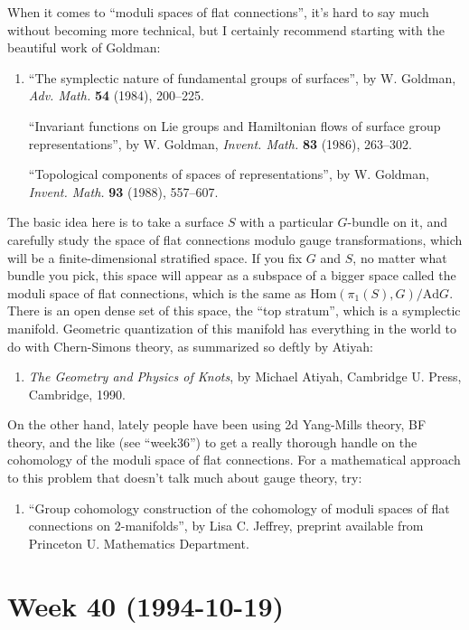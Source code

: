 \documentclass{article}
\def\tightlist{}
\begin{document}
When it comes to ``moduli spaces of flat connections'', it's hard to say
much without becoming more technical, but I certainly recommend starting
with the beautiful work of Goldman:

\begin{enumerate}
\def\labelenumi{\arabic{enumi})}
\setcounter{enumi}{3}
\item
  ``The symplectic nature of fundamental groups of surfaces'', by W.
  Goldman, \emph{Adv. Math.} \textbf{54} (1984), 200--225.

  ``Invariant functions on Lie groups and Hamiltonian flows of surface
  group representations'', by W. Goldman, \emph{Invent. Math.}
  \textbf{83} (1986), 263--302.

  ``Topological components of spaces of representations'', by W.
  Goldman, \emph{Invent. Math.} \textbf{93} (1988), 557--607.
\end{enumerate}

The basic idea here is to take a surface \(S\) with a particular
\(G\)-bundle on it, and carefully study the space of flat connections
modulo gauge transformations, which will be a finite-dimensional
stratified space. If you fix \(G\) and \(S\), no matter what bundle you
pick, this space will appear as a subspace of a bigger space called the
moduli space of flat connections, which is the same as
\(\mathrm{Hom}(\pi_1(S),G)/\mathrm{Ad} G\). There is an open dense set
of this space, the ``top stratum'', which is a symplectic manifold.
Geometric quantization of this manifold has everything in the world to
do with Chern-Simons theory, as summarized so deftly by Atiyah:

\begin{enumerate}
\def\labelenumi{\arabic{enumi})}
\setcounter{enumi}{4}
\tightlist
\item
  \emph{The Geometry and Physics of Knots}, by Michael Atiyah, Cambridge
  U. Press, Cambridge, 1990.
\end{enumerate}

On the other hand, lately people have been using 2d Yang-Mills theory,
BF theory, and the like (see ``week36'') to get a really thorough handle
on the cohomology of the moduli space of flat connections. For a
mathematical approach to this problem that doesn't talk much about gauge
theory, try:

\begin{enumerate}
\def\labelenumi{\arabic{enumi})}
\setcounter{enumi}{5}
\tightlist
\item
  ``Group cohomology construction of the cohomology of moduli spaces of
  flat connections on 2-manifolds'', by Lisa C. Jeffrey, preprint
  available from Princeton U. Mathematics Department.
\end{enumerate}
\hypertarget{week-40-1994-10-19}{%
\section{Week 40 (1994-10-19)}\label{week-40-1994-10-19}}
\end{document}
